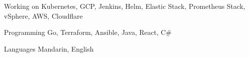 

\begin{cvskills}

  \cvskill
    {Working on} %
    {Kubernetes, GCP, Jenkins, Helm, Elastic Stack, Prometheus Stack, vSphere, AWS, Cloudflare} %

  \cvskill
    {Programming} %
    {Go, Terraform, Ansible, Java, React, C\#} %

  \cvskill
    {Languages} %
    {Mandarin, English} %

\end{cvskills}
